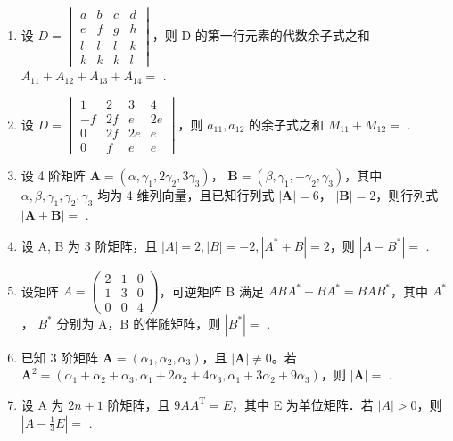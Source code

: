 \documentclass[12pt, a4paper]{ctexart}
\begin{document}
\begin{enumerate}
    \item 设 $ D=\begin{vmatrix} a & b & c & d \\ e & f & g & h \\ l & l & l & k \\ k & k & k & l \end{vmatrix} $，则 D 的第一行元素的代数余子式之和 $ A_{11}+A_{12}+A_{13}+A_{14}= $ \underline{\hspace{2cm}}.

    \item 设 $ D=\begin{vmatrix}1&2&3&4\\-f&2f&e&2e\\0&2f&2e&e\\0&f&e&e\end{vmatrix} $，则 $ a_{11},a_{12} $ 的余子式之和 $ M_{11}+M_{12}= $ \underline{\hspace{2cm}}.

    \item 设 4 阶矩阵 $ \mathbf{A} = (\alpha, \gamma_1, 2\gamma_2, 3\gamma_3) $， $ \mathbf{B} = (\beta, \gamma_1, -\gamma_2, \gamma_3) $，其中 $ \alpha, \beta, \gamma_1, \gamma_2, \gamma_3 $ 均为 4 维列向量，且已知行列式 $ |\mathbf{A}| = 6 $， $ |\mathbf{B}| = 2 $，则行列式 $ |\mathbf{A} + \mathbf{B}| = $ \underline{\hspace{2cm}}.

    \item 设 A, B 为 3 阶矩阵，且 $ |A|=2, |B|=-2, |A^*+B|=2 $，则 $ |A-B^*|= $ \underline{\hspace{2cm}}.

    \item 设矩阵 $ A = \begin{pmatrix} 2 & 1 & 0 \\ 1 & 3 & 0 \\ 0 & 0 & 4 \end{pmatrix} $，可逆矩阵 B 满足 $ ABA^* - BA^* = BAB^* $，其中 $ A^* $， $ B^* $ 分别为 A，B 的伴随矩阵，则 $ \left|B^*\right| = $ \underline{\hspace{2cm}}.

    \item 已知 3 阶矩阵 $ \mathbf{A} = (\alpha_1, \alpha_2, \alpha_3) $，且 $ |\mathbf{A}| \neq 0 $。若 $ \mathbf{A}^2 = (\alpha_1 + \alpha_2 + \alpha_3, \alpha_1 + 2\alpha_2 + 4\alpha_3, \alpha_1 + 3\alpha_2 + 9\alpha_3) $，则 $ |\mathbf{A}| = $ \underline{\hspace{2cm}}.

    \item 设 A 为 $ 2n+1 $ 阶矩阵，且 $ 9AA^{\mathrm{T}} = E $，其中 E 为单位矩阵．若 $ |A| > 0 $，则 $ \left|A - \frac{1}{3}E\right| = $ \underline{\hspace{2cm}}.
\end{enumerate}
\end{document}
